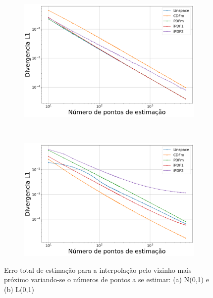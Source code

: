 \begin{figure}[H]
	\centering
	\begin{subfigure}[b]{0.45\textwidth}
		\centering 
		\includegraphics[width=\textwidth]{./figuras/ERRORPLOT_L1_TRUE_NORMAL_NEAREST_00}
		\caption{}
		\label{fig:errornormnearest}
	\end{subfigure}
	\hfill
	~ %
	\begin{subfigure}[b]{0.45\textwidth}
		\centering 
		\includegraphics[width=\textwidth]{./figuras/ERRORPLOT_L1_TRUE_LOGNORMAL_NEAREST_00}
		\caption{}
		\label{fig:errorlognearest}
	\end{subfigure}
	
	\caption{Erro total de estimação para a interpolação pelo vizinho mais próximo variando-se o números de pontos a se estimar: (a) N(0,1) e (b) L(0,1)}
	\label{fig:errorplotnearest}
\end{figure}


